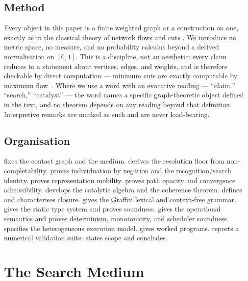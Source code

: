 \documentclass[11pt,twocolumn,a4paper]{article}
\theoremstyle{thmstyle}
\theoremstyle{definition}
\theoremstyle{remark}
\begin{document}
\subsection{Method}

Every object in this paper is a finite weighted graph or a construction on
one, exactly as in the classical theory of network flows and cuts
\citep{fordfulkerson1956,mengertheorem,ahuja1993network}. We introduce no
metric space, no measure, and no probability calculus beyond a derived
normalisation on $[0,1]$. This is a discipline, not an aesthetic: every
claim reduces to a statement about vertices, edges, and weights, and is
therefore checkable by direct computation --- minimum cuts are exactly
computable by maximum flow~\citep{fordfulkerson1956,goldberg1988new}. Where
we use a word with an evocative reading --- ``claim,'' ``search,''
``catalyst'' --- the word names a specific graph-theoretic object defined
in the text, and no theorem depends on any reading beyond that definition.
Interpretive remarks are marked as such and are never load-bearing.

\subsection{Organisation}

 fixes the contact graph and the medium.
 derives the resolution floor from non-completability.
 proves individuation by negation and the
recognition/search identity.  proves
representation mobility.  proves path opacity and
convergence admissibility.  develops the catalytic
algebra and the coherence theorem.  defines and
characterises closure.  gives the Graffiti lexical and
context-free grammar.  gives the static type system and
proves soundness.  gives the operational semantics and
proves determinism, monotonicity, and scheduler soundness.
 specifies the heterogeneous execution model.
 gives worked programs.  reports a
numerical validation suite.  states scope and
concludes.

\section{The Search Medium}
\label{sec:medium}
\end{document}
